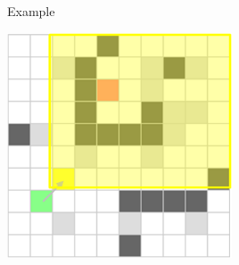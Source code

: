 \documentclass{presentation}
\begin{document}
\begin{frame}{Example}
    \begin{center}
        \includegraphics[width=0.5\textwidth]{figures/bounding_boxes2.png}
    \end{center}
\end{frame}



\begin{frame}
\end{frame}



\begin{frame}
\end{frame}
\end{document}
